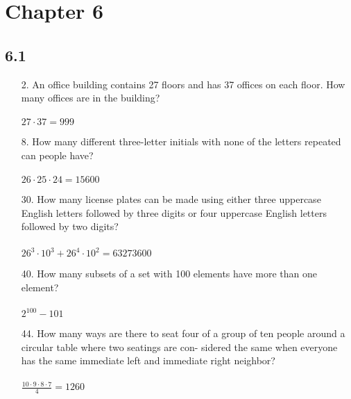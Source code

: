 \section{Chapter 6}
\subsection{6.1}
\begin{itemize}
    \item[2.]  An office building contains 27 floors and has 37 offices
          on each floor. How many offices are in the building? \\
          \answer \\
          $27 \cdot 37 = 999$

    \item[8.]  How many different three-letter initials with none of the
          letters repeated can people have? \\
          \answer \\
          $26 \cdot 25 \cdot 24 = 15600$

    \item[30.]  How many license plates can be made using either three
          uppercase English letters followed by three digits or four
          uppercase English letters followed by two digits? \\
          \answer\\
          $26^3 \cdot 10^3 + 26^4 \cdot 10^2 = 63273600$

    \item[40.] How many subsets of a set with 100 elements have more
          than one element?\\
          \answer \\
          $2^{100} -101$

    \item[44.]  How many ways are there to seat four of a group of ten
          people around a circular table where two seatings are con-
          sidered the same when everyone has the same immediate
          left and immediate right neighbor? \\
          \answer \\
          $\frac{10 \cdot 9 \cdot 8 \cdot 7}{4} = 1260$

\end{itemize}

